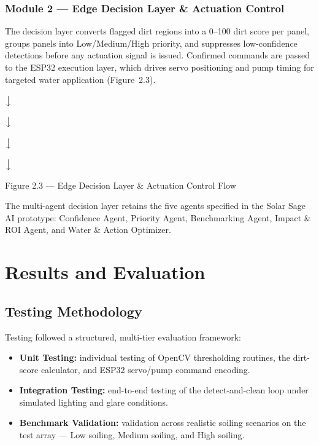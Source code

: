 \documentclass[12pt]{report}
\newcommand{\flowarrow}{\par\centering$\big\downarrow$\par}
\begin{document}
\subsection{Module 2 --- Edge Decision Layer \& Actuation Control}

The decision layer converts flagged dirt regions into a 0--100 dirt score per panel, groups panels into Low/Medium/High priority, and suppresses low-confidence detections before any actuation signal is issued. Confirmed commands are passed to the ESP32 execution layer, which drives servo positioning and pump timing for targeted water application (Figure~2.3).

\begin{center}
\begin{minipage}{0.7\linewidth}
\centering
{}
\flowarrow
{}
\flowarrow
{}
\flowarrow
{}
\flowarrow
{}
\end{minipage}
\end{center}
\begin{center}
\small Figure 2.3 --- Edge Decision Layer \& Actuation Control Flow
\end{center}

The multi-agent decision layer retains the five agents specified in the Solar Sage AI prototype: Confidence Agent, Priority Agent, Benchmarking Agent, Impact \& ROI Agent, and Water \& Action Optimizer.

\chapter{Results and Evaluation}

\section{Testing Methodology}

Testing followed a structured, multi-tier evaluation framework:

\begin{itemize}[leftmargin=*]
    \item \textbf{Unit Testing:} individual testing of OpenCV thresholding routines, the dirt-score calculator, and ESP32 servo/pump command encoding.
    \item \textbf{Integration Testing:} end-to-end testing of the detect-and-clean loop under simulated lighting and glare conditions.
    \item \textbf{Benchmark Validation:} validation across realistic soiling scenarios on the test array --- Low soiling, Medium soiling, and High soiling.
\end{itemize}
\end{document}
